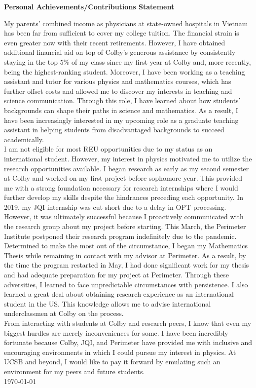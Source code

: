 \documentclass[12pt]{article}
\begin{document}
\begin{center}
	\textbf{Personal Achievements/Contributions Statement}
\end{center}
My parents' combined income as physicians at state-owned hospitals in Vietnam has been far from sufficient to cover my college tuition. The financial strain is even greater now with their recent retirements. However,  I have obtained additional financial aid on top of Colby's generous assistance by consistently staying in the top 5\% of my class since my first year at Colby and, more recently, being the highest-ranking student. Moreover, I have been working as a teaching assistant and tutor for various physics and mathematics courses, which has further offset costs and allowed me to discover my interests in teaching and science communication. Through this role, I have learned about how students' backgrounds can shape their paths in science and mathematics. As a result, I have been increasingly interested in my upcoming role as a graduate teaching assistant in helping students from disadvantaged backgrounds to succeed academically. \\

I am not eligible for most REU opportunities due to my status as an international student. However, my interest in physics motivated me to utilize the research opportunities available. I began research as early as my second semester at Colby and worked on my first project before sophomore year. This provided me with a strong foundation necessary for research internships where I would further develop my skills despite the hindrances preceding each opportunity. In 2019, my JQI internship was cut short due to a delay in OPT processing. However, it was ultimately successful because I proactively communicated with the research group about my project before starting. This March, the Perimeter Institute postponed their research program indefinitely due to the pandemic. Determined to make the most out of the circumstance, I began my Mathematics Thesis while remaining in contact with my advisor at Perimeter. As a result, by the time the program restarted in May, I had done significant work for my thesis and had adequate preparation for my project at Perimeter. Through these adversities, I learned to face unpredictable circumstances with persistence. I also learned a great deal about obtaining research experience as an international student in the US. This knowledge allows me to advise international underclassmen at Colby on the process.\\

From interacting with students at Colby and research peers, I know that even my biggest hurdles are merely inconveniences for some. I have been incredibly fortunate because Colby, JQI, and Perimeter have provided me with inclusive and encouraging environments in which I could pursue my interest in physics. At UCSB and beyond, I would like to pay it forward by emulating such an environment for my peers and future students.\\

\noindent \today
\end{document}
